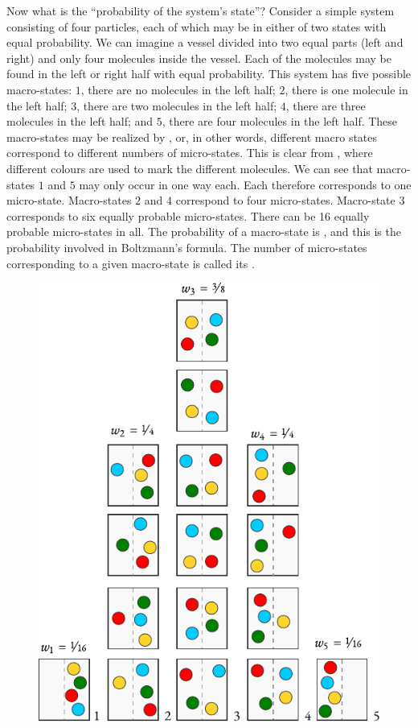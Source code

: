  Now what is the ``probability of the system's state''? Consider a simple system consisting of four particles, each of which may be in either of two states with equal probability. We can imagine a vessel divided into two equal parts (left and right) and only four molecules inside the vessel. Each of the molecules may be found in the left or right half with equal probability. This system has five possible macro-states: $\mathit{1}$, there are no molecules in the left half; $\mathit{2}$, there is one molecule in the left half; $\mathit{3}$, there are two molecules in the left half; $\mathit{4}$, there are three molecules in the left half; and $\mathit{5}$, there are four molecules in the left half. These macro-states may be realized by , or, in other words, different macro states correspond to different numbers of micro-states. This is clear from , where different colours are used to mark the different molecules. We can see that macro-states $\mathit{1}$ and $\mathit{5}$ may only occur in one way each. Each therefore corresponds to one micro-state. Macro-states $\mathit{2}$ and $\mathit{4}$ correspond to four micro-states. Macro-state $\mathit{3}$ corresponds to six equally probable micro-states. There can be 16 equally probable micro-states in all. The probability of a macro-state is , and this is the probability involved in Boltzmann's formula. The number of micro-states corresponding to a given macro-state is called its .

\begin{figure}[!ht]
 \centering
 \includegraphics[width=0.7\linewidth]{figures/macro-state-1.pdf}
 \end{figure}
 
